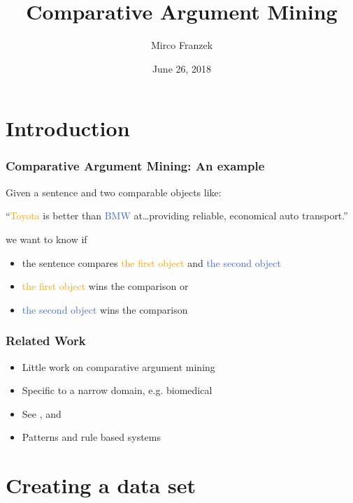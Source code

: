 \documentclass[11pt,aspectratio=169,usenames,dvipsnames]{beamer}
\title{Comparative Argument Mining}
\author{Mirco Franzek}
\date{June 26, 2018}
\begin{document}
    \maketitle

    \section{Introduction}
    \frame{\sectionpage}

    \begin{frame}[t]
        \frametitle{Comparative Argument Mining: An example}
        Given a sentence and two comparable objects like:

        \begin{center}
            \LARGE \enquote{\textcolor{orange}{Toyota} is better than \textcolor{RoyalBlue}{BMW} at\ldots providing reliable, economical auto transport.}
        \end{center}
        \pause
        we want to know if
        \begin{itemize}
            \item the sentence compares \textcolor{orange}{the first object} and \textcolor{RoyalBlue}{the second object}   \pause
            \item \textcolor{orange}{the first object} wins the comparison or   \pause
            \item \textcolor{RoyalBlue}{the second object} wins the comparison
        \end{itemize}

    \end{frame}

    \begin{frame}[t]
        \frametitle{Related Work}
        \begin{itemize}
            \item Little work on comparative argument mining
            \item Specific to a narrow domain, e.g. biomedical
            \item See \cite{fiszman2007interpreting}, \cite{Park:2012:ICC:2391171.2391173} and \cite{gupta2017identifying}
            \item Patterns and rule based systems
        \end{itemize}

    \end{frame}


    \section{Creating a data set}
    \frame{\sectionpage}
\end{document}
